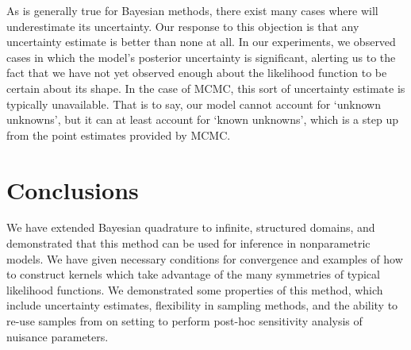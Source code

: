 As is generally true for Bayesian methods, there exist many cases where \bq{} will underestimate its uncertainty.  %
Our response to this objection is that any uncertainty estimate is better than none at all. In our experiments, we observed cases in which the model's posterior uncertainty is significant, alerting us to the fact that we have not yet observed enough about the likelihood function to be certain about its shape.  In the case of MCMC, this sort of uncertainty estimate is typically unavailable.  That is to say, our model cannot account for `unknown unknowns', but it can at least account for `known unknowns', which is a step up from the point estimates provided by MCMC.


\section{Conclusions}
We have extended Bayesian quadrature to infinite, structured domains, and demonstrated that this method can be used for inference in nonparametric models.  We have given necessary conditions for convergence and examples of how to construct kernels which take advantage of the many symmetries of typical likelihood functions.  We demonstrated some properties of this method, which include uncertainty estimates, flexibility in sampling methods, and the ability to re-use samples from on setting to perform post-hoc sensitivity analysis of nuisance parameters.







\outbpdocument{


}


